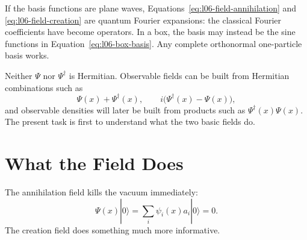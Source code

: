 If the basis functions are plane waves, Equations~\eqref{eq:l06-field-annihilation} and \eqref{eq:l06-field-creation} are quantum Fourier expansions: the classical Fourier coefficients have become operators. In a box, the basis may instead be the sine functions in Equation~\eqref{eq:l06-box-basis}. Any complete orthonormal one-particle basis works.

Neither \(\Psi\) nor \(\Psi^\dagger\) is Hermitian. Observable fields can be built from Hermitian combinations such as
\begin{equation}
\Psi(x)+\Psi^\dagger(x),
\qquad
i\bigl(\Psi^\dagger(x)-\Psi(x)\bigr),
\end{equation}
and observable densities will later be built from products such as \(\Psi^\dagger(x)\Psi(x)\). The present task is first to understand what the two basic fields do.

\begin{classroomqa}
\end{classroomqa}

\section{What the Field Does}

The annihilation field kills the vacuum immediately:
\begin{equation}
\Psi(x)|0\rangle
=\sum_i\psi_i(x)a_i|0\rangle
=0.
\label{eq:l06-field-kills-vacuum}
\end{equation}
The creation field does something much more informative.

